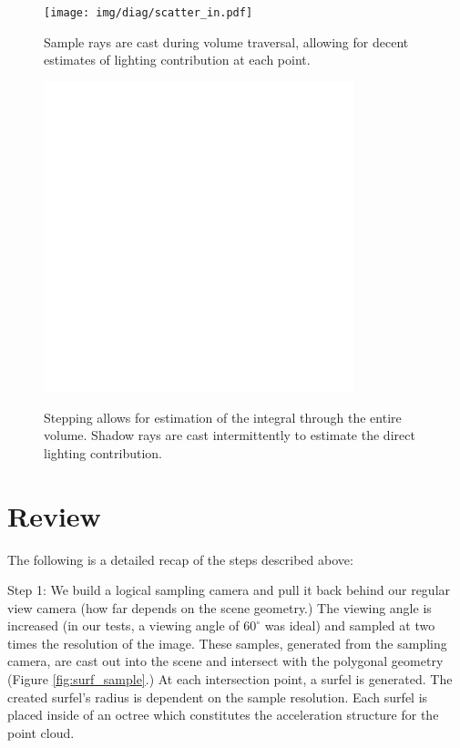 \documentclass[12pt]{ucthesis}
\newcommand{\captionfonts}{\small\bf\ssp}
\begin{document}
\begin{figure}[h!]
    \centering
    \texttt{[image: img/diag/scatter\_in.pdf]}
    \captionfonts
    \caption{Sample rays are cast during volume traversal, allowing for decent estimates of lighting contribution at each point.}
    \label{fig:scatter_in}
\end{figure}


\begin{figure}[h!]
    \centering
    \includegraphics[width=90mm]{img/diag/vol_step.pdf}
    \captionfonts
    \caption{Stepping allows for estimation of the integral through the entire volume.  Shadow rays are cast intermittently to estimate the direct lighting contribution. }
    \label{fig:vol_step}
\end{figure}



\section{Review}

The following is a detailed recap of the steps described above:

Step 1:  We build a logical sampling camera and pull it back behind our regular view camera (how far depends on the scene geometry.)  The viewing angle is increased (in our tests, a viewing angle of $60^{\circ}$ was ideal) and sampled at two times the resolution of the image.  These samples, generated from the sampling camera, are cast out into the scene and intersect with the polygonal geometry (Figure \ref{fig:surf_sample}.)  At each intersection point, a surfel is generated.  The created surfel's radius is dependent on the sample resolution.  Each surfel is placed inside of an octree which constitutes the acceleration structure for the point cloud.\\
\end{document}
